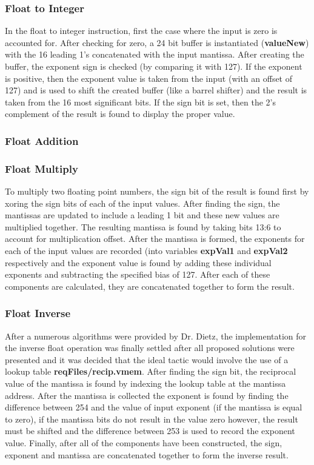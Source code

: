\documentclass[conference]{IEEEtran}
\begin{document}
\subsubsection{Float to Integer}
In the float to integer instruction, first the case where the input is zero is accounted for. After checking 
for zero, a 24 bit buffer is instantiated (\textbf{valueNew}) with the 16 leading 1's concatenated with the 
input mantissa. After creating the buffer, the exponent sign is checked (by comparing it with 127). If the
 exponent is positive, then the exponent value is taken from the input (with an offset of 127) and is used
 to shift the created buffer (like a barrel shifter) and the result is taken from the 16 most significant bits. If 
 the sign bit is set, then the 2's complement of the result is found to display the proper value. 
 
\subsubsection{Float Addition}

\subsubsection{Float Multiply}
To multiply two floating point numbers, the sign bit of the result is found first by xoring the sign bits of each
of the input values. After finding the sign, the mantissas are updated to include a leading 1 bit and these 
new values are multiplied together. The resulting mantissa is found by taking bits 13:6 to account for 
multiplication offset. After the mantissa is formed, the exponents for each of the input values are recorded
(into variables \textbf{expVal1} and \textbf{expVal2} respectively and the exponent value is found by
 adding these individual exponents and subtracting the specified bias of 127. After each of these components are calculated, they are concatenated together to form the result. 

\subsubsection{Float Inverse}
After a numerous algorithms were provided by Dr. Dietz, the implementation for the 
inverse float operation was finally settled after all proposed solutions were presented
and it was decided that the ideal tactic would involve the use of a lookup 
table \textbf{reqFiles/recip.vmem}. After finding the sign bit, the reciprocal value of the mantissa
is found by indexing the lookup table at the mantissa address. After the mantissa is collected
the exponent is found by finding the difference between 254 and the value of input exponent (if 
the mantissa is equal to zero), if the mantissa bits do not result in the value zero however, the 
result must be shifted and the difference between 253 is used to record the exponent value.
Finally, after all of the components have been constructed, the sign, exponent and mantissa
are concatenated together to form the inverse result. 
 
\end{document}
